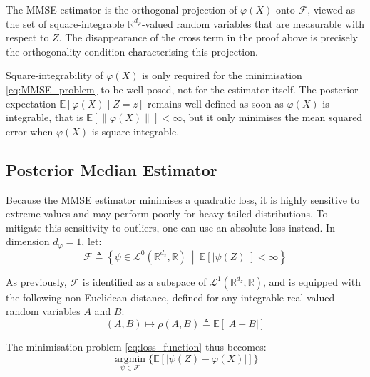 \begin{remark}
	The MMSE estimator is the orthogonal projection of $\varphi(X)$ onto $\mathcal{F}$, viewed as the set of square-integrable $\mathbb{R}^{d_{\varphi}}$-valued random variables that are measurable with respect to $Z$. The disappearance of the cross term in the proof above is precisely the orthogonality condition characterising this projection.
\end{remark}

\begin{remark}
	Square-integrability of $\varphi(X)$ is only required for the minimisation \eqref{eq:MMSE_problem} to be well-posed, not for the estimator itself. The posterior expectation $\mathbb{E}[\varphi(X)\mid Z=z]$ remains well defined as soon as $\varphi(X)$ is integrable, that is $\mathbb{E}[\|\varphi(X)\|]<\infty$, but it only minimises the mean squared error when $\varphi(X)$ is square-integrable.
\end{remark}

\subsection{Posterior Median Estimator}

Because the MMSE estimator minimises a quadratic loss, it is highly sensitive to extreme values and may perform poorly for heavy-tailed distributions. To mitigate this sensitivity to outliers, one can use an absolute loss instead. In dimension $d_{\varphi}=1$, let:
\begin{equation}
	\mathcal{F}\triangleq\left\{\psi\in\mathcal{L}^0\left(\mathbb{R}^{d_z},\mathbb{R}\right)\:\middle|\:\mathbb{E}[|\psi(Z)|]<\infty\right\}
\end{equation}

As previously, $\mathcal{F}$ is identified as a subspace of $\mathcal{L}^1\left(\mathbb{R}^{d_z},\mathbb{R}\right)$, and is equipped with the following non-Euclidean distance, defined for any integrable real-valued random variables $A$ and $B$:
\begin{equation}
	(A,B)\mapsto\rho(A,B)\triangleq\mathbb{E}[|A-B|]
\end{equation}

The minimisation problem \eqref{eq:loss_function} thus becomes:
\begin{equation}
	\underset{\psi\in\mathcal{F}}{\operatorname{argmin}}\{\mathbb{E}[|\psi(Z)-\varphi(X)|]\}\label{eq:median_problem}
\end{equation}

